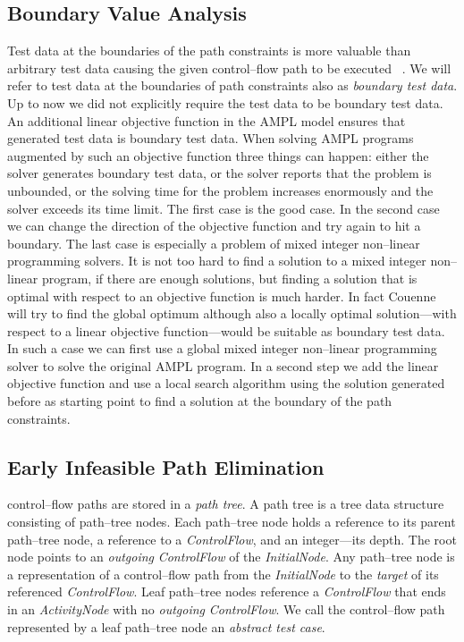 \documentclass[runningheads,a4paper]{llncs}%
\newcommand{\UMLType}[1]{\textsf{\textit{#1}}} %
\newcommand{\UMLReference}[1]{\textsf{\textit{#1}}} %
\begin{document}
\subsection{Boundary Value Analysis}%
\label{sec:BoundaryValueAnalysis}%
Test data at the boundaries of the path constraints is more valuable than
arbitrary test data causing the given control--flow path to be executed
~\cite{Kosmatov04BoundaryCoverageCrit}. We will refer to test data at the
boundaries of path constraints also as \emph{boundary test data}. Up to now we
did not explicitly require the test data to be boundary test data. An additional
linear objective function in the AMPL model ensures that generated test data is
boundary test data. When solving AMPL programs augmented by such an objective
function three things can happen: either the solver generates boundary test
data, or the solver reports that the problem is unbounded, or the solving time
for the problem increases enormously and the solver exceeds its time limit.
The first case is the good case. In the second case we can change the direction
of the objective function and try again to hit a boundary. The last case is
especially a problem of mixed integer non--linear programming solvers. It is not
too hard to find a solution to a mixed integer non--linear program, if there are
enough solutions, but finding a solution that is optimal with respect to an
objective function is much harder. In fact Couenne will try to find the global
optimum although also a locally optimal solution---with respect to a linear
objective function---would be suitable as boundary test data. In such a case we
can first use a global mixed integer non--linear programming solver to solve the
original AMPL program. In a second step we add the linear objective function and
use a local search algorithm using the solution generated before as starting
point to find a solution at the boundary of the path constraints.
%
\subsection{Early Infeasible Path Elimination}%
\label{sec:InfeasiblePathElimination}%
control--flow paths are stored in a \emph{path tree}. A path tree is a tree data
structure consisting of path--tree nodes. Each path--tree node holds a reference
to its parent path--tree node, a reference to a \UMLType{ControlFlow}, and an
integer---its depth. The root node points to an \UMLReference{outgoing}
\UMLType{ControlFlow} of the \UMLType{InitialNode}. Any path--tree node is a
representation of a control--flow path from the \UMLType{InitialNode} to the
\UMLReference{target} of its referenced \UMLType{ControlFlow}. Leaf path--tree
nodes reference a \UMLType{ControlFlow} that ends in an \UMLType{ActivityNode}
with no \UMLReference{outgoing} \UMLType{ControlFlow}. We call the control--flow
path represented by a leaf path--tree node an \emph{abstract test case}.
\end{document}
